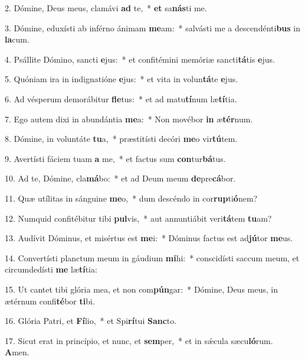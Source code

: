 2. Dómine, Deus meus, clamávi \textbf{ad} te,~*  \textbf{et} sa\textbf{nás}ti me.\

3. Dómine, eduxísti ab inférno ánimam \textbf{me}am:~*  salvásti me a descendénti\textbf{bus} in \textbf{la}cum.\

4. Psállite Dómino, sancti \textbf{e}jus:~*  et confitémini memóriæ sancti\textbf{tá}tis \textbf{e}jus.\

5. Quóniam ira in indignatióne \textbf{e}jus:~*  et vita in volun\textbf{tá}te \textbf{e}jus.\

6. Ad vésperum demorábitur \textbf{fle}tus:~*  et ad matu\textbf{tí}num læ\textbf{tí}tia.\

7. Ego autem dixi in abundántia \textbf{me}a:~*  Non movébor \textbf{in} æ\textbf{tér}num.\

8. Dómine, in voluntáte \textbf{tu}a,~*  præstitísti decóri \textbf{me}o vir\textbf{tú}tem.\

9. Avertísti fáciem tuam \textbf{a} me,~*  et factus sum \textbf{con}tur\textbf{bá}tus.\

10. Ad te, Dómine, cla\textbf{má}bo:~*  et ad Deum meum \textbf{de}pre\textbf{cá}bor.\

11. Quæ utílitas in sánguine \textbf{me}o,~*  dum descéndo in cor\textbf{rup}ti\textbf{ó}nem?\

12. Numquid confitébitur tibi \textbf{pul}vis,~*  aut annuntiábit veri\textbf{tá}tem \textbf{tu}am?\

13. Audívit Dóminus, et misértus est \textbf{me}i:~*  Dóminus factus est ad\textbf{jú}tor \textbf{me}us.\

14. Convertísti planctum meum in gáudium \textbf{mi}hi:~*  conscidísti saccum meum, et circumdedísti \textbf{me} læ\textbf{tí}tia:\

15. Ut cantet tibi glória mea, et non com\textbf{pún}gar:~*  Dómine, Deus meus, in ætérnum confi\textbf{té}bor \textbf{ti}bi.\

16. Glória Patri, et \textbf{Fí}lio,~*  et Spi\textbf{rí}tui \textbf{Sanc}to.\

17. Sicut erat in princípio, et nunc, et \textbf{sem}per,~*  et in sǽcula sæcu\textbf{ló}rum. \textbf{A}men.\

